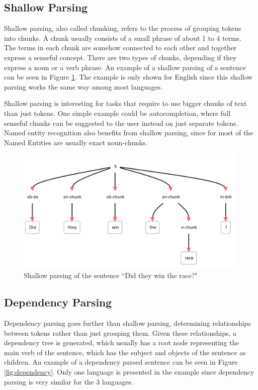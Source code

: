\documentclass{bsu-ms}
\begin{document}
\subsection{Shallow Parsing}
Shallow parsing, also called chunking, refers to the process of grouping tokens into chunks. A chunk usually consists of a small phrase of about 1 to 4 terms. The terms in each chunk are somehow connected to each other and together express a senseful concept. There are two types of chunks, depending if they express a noun or a verb phrase. An example of a shallow parsing of a sentence can be seen in Figure \ref{fig:shallow}. The example is only shown for English since this shallow parsing works the same way among most languages.

Shallow parsing is interesting for tasks that require to use bigger chunks of text than just tokens. One simple example could be autocompletion, where full senseful chunks can be suggested to the user instead on just separate tokens. Named entity recognition also benefits from shallow parsing, since for most of the Named Entities are usually exact noun-chunks.

\begin{figure}[h!]
\centering
\includegraphics[width=\textwidth]{shallow}
\caption{Shallow parsing of the sentence ``Did they win the race?"}
\label{fig:shallow}
\end{figure}



\subsection{Dependency Parsing}
Dependency parsing goes further than shallow parsing, determining relationships between tokens rather than just grouping them. Given these relationships, a dependency tree is generated, which usually has a root node representing the main verb of the sentence, which has the subject and objects of the sentence as children. An example of a dependency parsed sentence can be seen in Figure \ref{fig:dependency}. Only one language is presented in the example since dependency parsing is very similar for the 3 languages.
\end{document}

